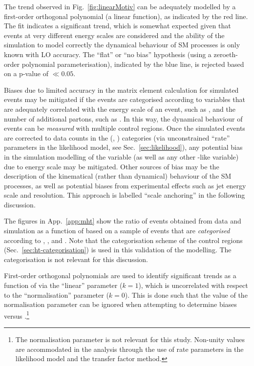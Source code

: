 The trend observed in Fig.~\ref{fig:linearMotiv} can be adequately
modelled by a first-order orthogonal polynomial (\ie a linear
function), as indicated by the red line. The fit indicates a
significant trend, which is somewhat expected given that events at
very different energy scales are considered and the ability of the
simulation to model correctly the dynamical behaviour of SM processes
is only known with LO accuracy. The ``flat'' or ``no bias'' hypothesis
(using a zeroeth-order polynomial parameterisation), indicated by the
blue line, is rejected based on a p-value of $\ll 0.05$.

Biases due to limited accuracy in the matrix element calculation for
simulated events may be mitigated if the events are categorised
according to variables that are adequately correlated with the energy
scale of an event, such as \scalht, and the number of additional
partons, such as \njet. In this way, the dynamical behaviour of events
can be {\it measured} with multiple control regions. Once the
simulated events are corrected to data counts in the (\njet, \scalht)
categories (via unconstrained ``rate'' parameters in the likelihood
model, see Sec.~\ref{sec:likelihood}), any potential bias in the
simulation modelling of the \mht variable (as well as any other
\met-like variable) due to energy scale may be mitigated. Other
sources of bias may be the description of the kinematical (rather than
dynamical) behaviour of the SM processes, as well as potential biases
from experimental effects such as jet energy scale and
resolution. This approach is labelled ``scale anchoring'' in the
following discussion. 

The figures in App.~\ref{app:mht} show the ratio of events obtained
from data and simulation as a function of \mht based on a sample of
\mj events that are {\it categorised} according to \njet, \scalht, and
\nb. Note that the \scalht categorisation scheme of the control
regions (Sec.~\ref{sec:ht-categorisation}) is used in this validation
of the \mht modelling. The \nb categorisation is not relevant
for this discussion.

First-order orthogonal polynomials are used to identify significant
trends as a function of \mht via the ``linear'' parameter ($k = 1$),
which is uncorrelated with respect to the ``normalisation'' parameter
($k = 0$). This is done such that the value of the normalisation
parameter can be ignored when attempting to determine biases versus
\mht.\footnote{The normalisation parameter is not relevant for this
  study. Non-unity values are accommodated in the analysis through the
  use of rate parameters in the likelihood model and the transfer
  factor method.}

